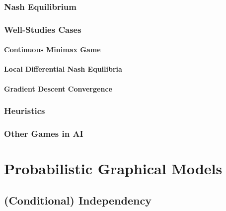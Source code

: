 		\subsection{Nash Equilibrium} %

		\subsection{Well-Studies Cases} %

			\subsubsection{Continuous Minimax Game} %

			\subsubsection{Local Differential Nash Equilibria} %

			\subsubsection{Gradient Descent Convergence} %

		\subsection{Heuristics} %

		\subsection{Other Games in AI} %

\chapter{Probabilistic Graphical Models} %

	\section{(Conditional) Independency} %

